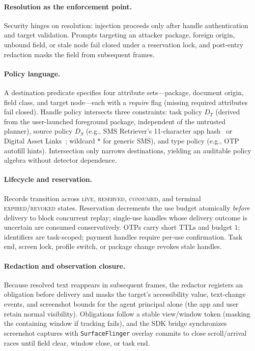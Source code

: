 \documentclass[sigconf,10pt]{acmart}
\theoremstyle{acmplain}%
\begin{document}
\paragraph{Resolution as the enforcement point.} Security hinges on resolution: injection proceeds only after handle authentication and target validation. Prompts targeting an attacker package, foreign origin, unbound field, or stale node fail closed under a reservation lock, and post-entry redaction masks the field from subsequent frames.

\paragraph{Policy language.} A destination predicate specifies four attribute sets---package, document origin, field class, and target node---each with a \emph{require} flag (missing required attributes fail closed). Handle policy intersects three constraints: task policy $D_T$ (derived from the user-launched foreground package, independent of the untrusted planner), source policy $D_S$ (e.g., SMS Retriever's 11-character app hash~\cite{androidSmsRetriever} or Digital Asset Links~\cite{androidCredentialManager}; wildcard $*$ for generic SMS), and type policy (e.g., OTP autofill hints). Intersection only narrows destinations, yielding an auditable policy algebra without detector dependence.

\paragraph{Lifecycle and reservation.} Records transition across \textsc{live}, \textsc{reserved}, \textsc{consumed}, and terminal \textsc{expired}/\textsc{revoked} states. Reservation decrements the use budget atomically \emph{before} delivery to block concurrent replay; single-use handles whose delivery outcome is uncertain are consumed conservatively. OTPs carry short TTLs and budget $1$; identifiers are task-scoped; payment handles require per-use confirmation. Task end, screen lock, profile switch, or package change revokes stale handles.

\paragraph{Redaction and observation closure.} Because resolved text reappears in subsequent frames, the redactor registers an obligation before delivery and masks the target's accessibility value, text-change events, and screenshot bounds for the agent principal alone (the app and user retain normal visibility). Obligations follow a stable view/window token (masking the containing window if tracking fails), and the SDK bridge synchronizes screenshot captures with \texttt{SurfaceFlinger} overlay commits to close scroll/arrival races until field clear, window close, or task end.
\end{document}
